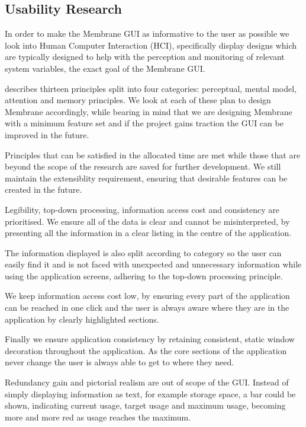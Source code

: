 \documentclass[11pt, a4paper, twocolumn, twoside]{report}
\begin{document}
\subsection{Usability Research}

In order to make the Membrane GUI as informative to the user as possible we look into Human Computer Interaction (HCI), specifically display designs which are typically designed to help with the perception and monitoring of relevant system variables, the exact goal of the Membrane GUI.

\cite{wickens1998introduction} describes thirteen principles split into four categories: perceptual, mental model, attention and memory principles. We look at each of these plan to design Membrane accordingly, while bearing in mind that we are designing Membrane with a minimum feature set \citep{blank2010mfs} and if the project gains traction the GUI can be improved in the future.

Principles that can be satisfied in the allocated time are met while those that are beyond the scope of the research are saved for further development. We still maintain the extensiblity requirement, ensuring that desirable features can be created in the future.

Legibility, top-down processing, information access cost and consistency are prioritised. We ensure all of the data is clear and cannot be misinterpreted, by presenting all the information in a clear listing in the centre of the application.

The information displayed is also split according to category so the user can easily find it and is not faced with unexpected and unnecessary information while using the application screens, adhering to the top-down processing principle.

We keep information access cost low, by ensuring every part of the application can be reached in one click and the user is always aware where they are in the application by clearly highlighted sections.

Finally we ensure application consistency by retaining consistent, static window decoration throughout the application. As the core sections of the application never change the user is always able to get to where they need.

Redundancy gain and pictorial realism are out of scope of the GUI. Instead of simply displaying information as text, for example storage space, a bar could be shown, indicating current usage, target usage and maximum usage, becoming more and more red as usage reaches the maximum.
\end{document}
